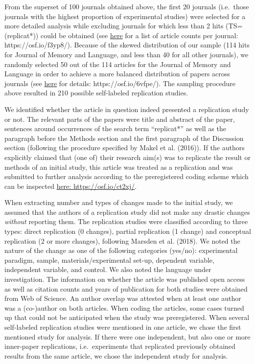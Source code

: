 \documentclass[]{elsarticle} %
\begin{document}
From the superset of 100 journals obtained above, the first 20 journals
(i.e.~those journals with the highest proportion of experimental
studies) were selected for a more detailed analysis while excluding
journals for which less than 2 hits (TS=(replicat*)) could be obtained
(see \href{https://osf.io/f3yp8/}{here} for a list of article counts per
journal: https://osf.io/f3yp8/). Because of the skewed distribution of
our sample (114 hits for Journal of Memory and Language, and less than
40 for all other journals), we randomly selected 50 out of the 114
articles for the Journal of Memory and Language in order to achieve a
more balanced distribution of papers across journals (see
\href{https://osf.io/6vfpe/}{here} for details: https://osf.io/6vfpe/).
The sampling procedure above resulted in 210 possible self-labeled
replication studies.

We identified whether the article in question indeed presented a
replication study or not. The relevant parts of the papers were title
and abstract of the paper, sentences around occurrences of the search
term ``replicat*'' as well as the paragraph before the Methods section
and the first paragraph of the Discussion section (following the
procedure specified by Makel et al. (2016)). If the authors explicitly
claimed that (one of) their research aim(s) was to replicate the result
or methods of an initial study, this article was treated as a
replication and was submitted to further analysis according to the
preregistered coding scheme which can be inspected
\href{https://osf.io/ct2xj/}{here: https://osf.io/ct2xj/}.

When extracting number and types of changes made to the initial study,
we assumed that the authors of a replication study did not make any
drastic changes \emph{without} reporting them. The replication studies
were classified according to three types: direct replication (0
changes), partial replication (1 change) and conceptual replication (2
or more changes), following Marsden et al. (2018). We noted the nature
of the change as one of the following categories (yes/no): experimental
paradigm, sample, materials/experimental set-up, dependent variable,
independent variable, and control. We also noted the language under
investigation. The information on whether the article was published open
access as well as citation counts and years of publication for both
studies were obtained from Web of Science. An author overlap was
attested when at least one author was a (co-)author on both articles.
When coding the articles, some cases turned up that could not be
anticipated when the study was preregistered. When several self-labeled
replication studies were mentioned in one article, we chose the first
mentioned study for analysis. If there were one independent, but also
one or more inner-paper replications, i.e.~experiments that replicated
previously obtained results from the same article, we chose the
independent study for analysis.
\end{document}
